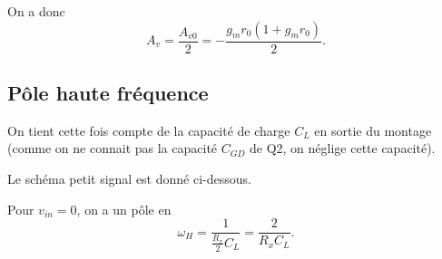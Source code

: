 \documentclass[frenchb,DIV=14]{scrartcl}
\begin{document}
On a donc \[A_v = \frac{A_{v0}}{2} = -\frac{g_mr_0(1+g_mr_0)}{2}.\]

\subsection*{Pôle haute fréquence}

On tient cette fois compte de la capacité de charge $C_L$ en sortie du montage
(comme on ne connait pas la capacité $C_{GD}$ de Q2, on néglige cette capacité).

Le schéma petit signal est donné ci-dessous.
\begin{center}
\end{center}

Pour $v_{in} = 0$, on a un pôle en
\[\omega_H = \frac{1}{\frac{R_{x}}{2}C_L} = \frac{2}{R_{x}C_L}.\]
\end{document}
